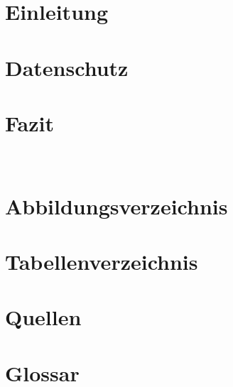 \documentclass[11pt]{article}
\begin{document}
    
    \pagebreak
    \tableofcontents
    \pagebreak
    \section{Einleitung}
    
    \pagebreak
    \section{Datenschutz}
    
    \pagebreak
    
    \pagebreak
    \section{Fazit}
    \\
    \pagebreak
    \section{Abbildungsverzeichnis}
    
    \pagebreak
    \section{Tabellenverzeichnis}
    \listoftables
    \pagebreak
    \section{Quellen}
    
    \pagebreak
    \section{Glossar}
    
\end{document}
